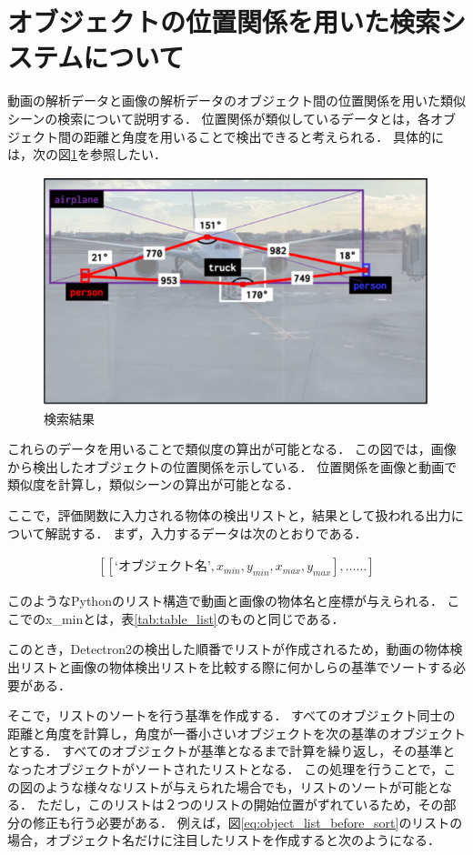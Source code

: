 \documentclass[a4j,12pt,dvipdfmx]{jreport}
\begin{document}
\section{オブジェクトの位置関係を用いた検索システムについて}
動画の解析データと画像の解析データのオブジェクト間の位置関係を用いた類似シーンの検索について説明する．
位置関係が類似しているデータとは，各オブジェクト間の距離と角度を用いることで検出できると考えられる．
具体的には，次の図\ref{fig:object_relationship}を参照したい．

\begin{figure}[b]
  \centering
  \includegraphics[width=13cm]{image/object_relationship.png}
  \caption{検索結果}
  \label{fig:object_relationship}
\end{figure}

これらのデータを用いることで類似度の算出が可能となる．
この図では，画像から検出したオブジェクトの位置関係を示している．
位置関係を画像と動画で類似度を計算し，類似シーンの算出が可能となる．

ここで，評価関数に入力される物体の検出リストと，結果として扱われる出力について解説する．
まず，入力するデータは次のとおりである．

\begin{eqnarray}
  \label{eq:object_list}
  [[‘オブジェクト名’,x_{min},y_{min},x_{max},y_{max}],……]
\end{eqnarray}

このようなPythonのリスト構造で動画と画像の物体名と座標が与えられる．
ここでのx_{min}とは，表\ref{tab:table_list}のものと同じである．

このとき，Detectron2の検出した順番でリストが作成されるため，動画の物体検出リストと画像の物体検出リストを比較する際に何かしらの基準でソートする必要がある．

そこで，リストのソートを行う基準を作成する．
すべてのオブジェクト同士の距離と角度を計算し，角度が一番小さいオブジェクトを次の基準のオブジェクトとする．
すべてのオブジェクトが基準となるまで計算を繰り返し，その基準となったオブジェクトがソートされたリストとなる．
この処理を行うことで，この図のような様々なリストが与えられた場合でも，リストのソートが可能となる．
ただし，このリストは２つのリストの開始位置がずれているため，その部分の修正も行う必要がある．
例えば，図\ref{eq:object_list_before_sort}のリストの場合，オブジェクト名だけに注目したリストを作成すると次のようになる．
\end{document}
